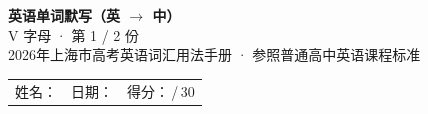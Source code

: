\documentclass[10pt,a4paper]{article}
\begin{document}
\pagestyle{plain}

\begin{center}
{\LARGE\bfseries 英语单词默写（英 $\to$ 中）}\\[0.22em]
{\large V 字母 · 第 1 / 2 份}\\[0.18em]
{\small 2026年上海市高考英语词汇用法手册 · 参照普通高中英语课程标准}
\end{center}

\vspace{0.25em}
\noindent\begin{tabular}{@{}p{}@{}p{}@{}p{}@{}}
姓名：\underline{\hspace{2.0cm}} & 日期：\underline{\hspace{2.0cm}} & 得分：\underline{\hspace{1.3cm}}\,/\,30 \\
\end{tabular}

\vspace{0.3em}

\vspace{0.08em}
\end{document}
